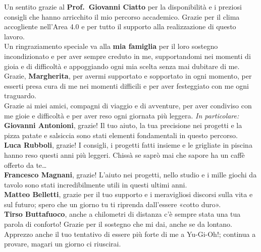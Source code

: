 \documentclass[12pt,a4paper,openright,twoside]{book}
\begin{document}

\backmatter

\nocite{*} %




\begin{acknowledgements} %

Un sentito grazie al \textbf{Prof.\ Giovanni Ciatto} per la disponibilità e i preziosi consigli che hanno arricchito il mio percorso accademico.  
Grazie per il clima accogliente nell’Area 4.0 e per tutto il supporto alla realizzazione di questo lavoro.
\\
Un ringraziamento speciale va alla \textbf{mia famiglia} per il loro sostegno incondizionato e per aver sempre creduto in me,  
supportandomi nei momenti di gioia e di difficoltà e appoggiando ogni mia scelta senza mai dubitare di me.
\\
Grazie, \textbf{Margherita}, per avermi supportato e sopportato in ogni momento,  
per esserti presa cura di me nei momenti difficili e per aver festeggiato con me ogni traguardo.
\\
Grazie ai miei amici, compagni di viaggio e di avventure, per aver condiviso con me gioie e difficoltà  
e per aver reso ogni giornata più leggera. \textit{In particolare:}
\\
\textbf{Giovanni Antonioni}, grazie! Il tuo aiuto, la tua precisione nei progetti e la pizza patate e salsiccia  
sono stati elementi fondamentali in questo percorso.
\\
\textbf{Luca Rubboli}, grazie! I consigli, i progetti fatti insieme e le grigliate in piscina  
hanno reso questi anni più leggeri. Chissà se saprò mai che sapore ha un caffè offerto da te\dots
\\
\textbf{Francesco Magnani}, grazie! L’aiuto nei progetti, nello studio e i mille giochi da tavolo  
sono stati incredibilmente utili in questi ultimi anni.
\\
\textbf{Matteo Belletti}, grazie per il tuo supporto e i meravigliosi discorsi sulla vita e sul futuro;  
spero che un giorno tu ti riprenda dall’essere «cotto duro».
\\
\textbf{Tirso Buttafuoco}, anche a chilometri di distanza c’è sempre stata una tua parola di conforto!  
Grazie per il sostegno che mi dai, anche se da lontano.  
Apprezzo anche il tuo tentativo di essere più forte di me a Yu-Gi-Oh!; continua a provare, magari un giorno ci riuscirai.



\end{acknowledgements}
\end{document}
